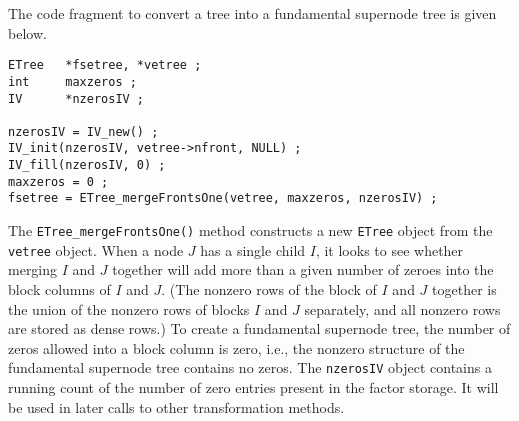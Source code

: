 \par
The code fragment to convert a tree into a fundamental supernode tree is
given below.
\begin{verbatim}
ETree   *fsetree, *vetree ;
int     maxzeros ;
IV      *nzerosIV ;

nzerosIV = IV_new() ;
IV_init(nzerosIV, vetree->nfront, NULL) ;
IV_fill(nzerosIV, 0) ;
maxzeros = 0 ;
fsetree = ETree_mergeFrontsOne(vetree, maxzeros, nzerosIV) ;
\end{verbatim}
The {\tt ETree\_mergeFrontsOne()} method constructs a new {\tt ETree}
object from the {\tt vetree} object.
When a node $J$ has a single child $I$, it looks to see whether merging
$I$ and $J$ together will add more than a given number of zeroes into
the block columns of $I$ and $J$.
(The nonzero rows of the block of $I$ and $J$ together is the union of
the nonzero rows of blocks $I$ and $J$ separately, and all nonzero rows
are stored as dense rows.)
To create a fundamental supernode tree, the number of
zeros allowed into a block column is zero, i.e., the nonzero structure 
of the fundamental supernode tree contains no zeros.
The {\tt nzerosIV} object contains a running count of the number of zero
entries present in the factor storage.
It will be used in later calls to other transformation methods.
\par
